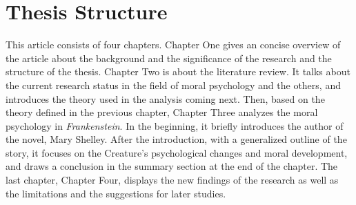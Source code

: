 


\section{Thesis Structure} %
\label{sec:thesis_structure}
\begin{text}

This article consists of four chapters. Chapter One gives an concise overview of the article about the background and the significance of the research and the structure of the thesis. Chapter Two is about the literature review. It talks about the current research status in the field of moral psychology and the others, and introduces the theory used in the analysis coming next. Then, based on the theory defined in the previous chapter, Chapter Three analyzes the moral psychology in \textit{Frankenstein}. In the beginning, it briefly introduces the author of the novel, Mary Shelley. After the introduction, with a generalized outline of the story, it focuses on the Creature's psychological changes and moral development, and draws a conclusion in the summary section at the end of the chapter. The last chapter, Chapter Four, displays the new findings of the research as well as the limitations and the suggestions for later studies.

\end{text}
